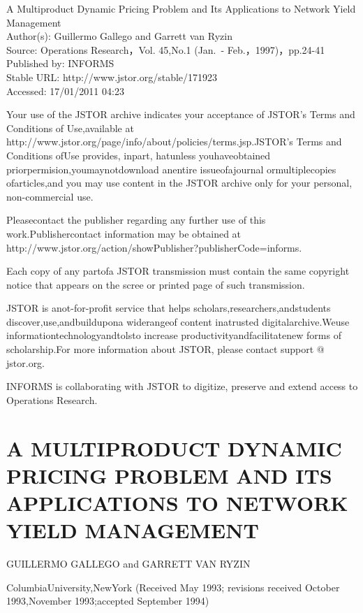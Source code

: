 


A Multiproduct Dynamic Pricing Problem and Its Applications to Network
Yield Management\\
Author(s): Guillermo Gallego and Garrett van Ryzin\\
Source: Operations Research，Vol. 45,No.1 (Jan.~-
Feb.，1997)，pp.24-41\\
Published by: INFORMS\\
Stable URL: http://www.jstor.org/stable/171923\\
Accessed: 17/01/2011 04:23

Your use of the JSTOR archive indicates your acceptance of JSTOR's Terms
and Conditions of Use,available at
http://www.jstor.org/page/info/about/policies/terms.jsp.JSTOR's Terms
and Conditions ofUse provides, inpart, hatunless youhaveobtained
priorpermision,youmaynotdownload anentire issueofajournal
ormultiplecopies ofarticles,and you may use content in the JSTOR archive
only for your personal, non-commercial use.

Pleasecontact the publisher regarding any further use of this
work.Publishercontact information may be obtained at
http://www.jstor.org/action/showPublisher?publisherCode=informs.

Each copy of any partofa JSTOR transmission must contain the same
copyright notice that appears on the scree or printed page of such
transmission.

JSTOR is anot-for-profit service that helps
scholars,researchers,andstudents discover,use,andbuildupona widerangeof
content inatrusted digitalarchive.Weuse informationtechnologyandtolsto
increase productivityandfacilitatenew forms of scholarship.For more
information about JSTOR, please contact support \(@\) jstor.org.

INFORMS is collaborating with JSTOR to digitize, preserve and extend
access to Operations Research.

\section{A MULTIPRODUCT DYNAMIC PRICING PROBLEM AND ITS APPLICATIONS TO
NETWORK YIELD
MANAGEMENT}\label{a-multiproduct-dynamic-pricing-problem-and-its-applications-to-network-yield-management}

GUILLERMO GALLEGO and GARRETT VAN RYZIN

ColumbiaUniversity,NewYork (Received May 1993; revisions received
October 1993,November 1993;accepted September 1994)

